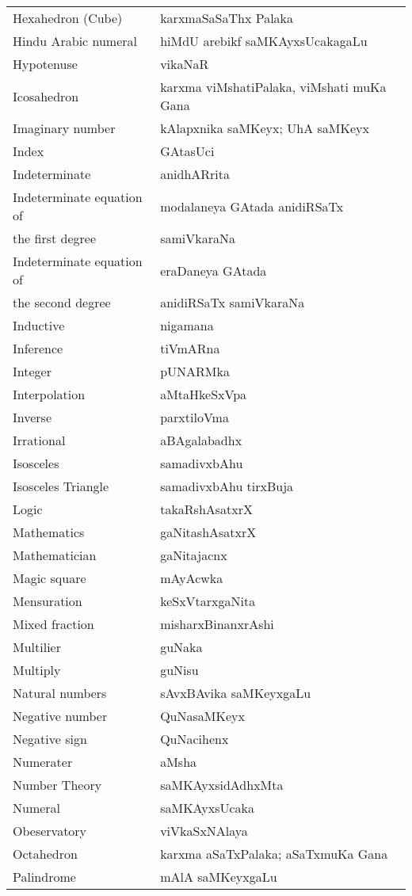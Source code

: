 {\begin{longtable}{>{\rm}l@{\hspace{1cm}}l}
Hexahedron (Cube) & karxmaSaSaThx Palaka\\
Hindu Arabic numeral & hiMdU arebikf saMKAyxsUcakagaLu\\
Hypotenuse & vikaNaR\\
Icosahedron & karxma viMshatiPalaka, viMshati muKa Gana\\
Imaginary number  & kAlapxnika saMKeyx; UhA saMKeyx\\
Index & GAtasUci\\
Indeterminate & anidhARrita\\
Indeterminate equation of & modalaneya GAtada anidiRSaTx\\[-0.1cm]
the first degree & samiVkaraNa\\
Indeterminate equation of & eraDaneya GAtada\\[-0.1cm] 
the second degree &  anidiRSaTx samiVkaraNa\\
Inductive & nigamana\\
Inference & tiVmARna\\
Integer & pUNARMka\\
Interpolation & aMtaHkeSxVpa\\
Inverse & parxtiloVma\\
Irrational & aBAgalabadhx\\
Isosceles & samadivxbAhu\\
Isosceles Triangle & samadivxbAhu tirxBuja\\
Logic & takaRshAsatxrX\\
Mathematics & gaNitashAsatxrX\\
Mathematician & gaNitajacnx\\
Magic square & mAyAcwka\\
Mensuration & keSxVtarxgaNita\\
Mixed fraction & misharxBinanxrAshi\\
Multilier & guNaka\\
Multiply & guNisu\\
Natural numbers & sAvxBAvika saMKeyxgaLu\\
Negative number & QuNasaMKeyx\\
Negative sign & QuNacihenx\\
Numerater & aMsha\\
Number Theory & saMKAyxsidAdhxMta\\
Numeral & saMKAyxsUcaka\\
Obeservatory & viVkaSxNAlaya\\
Octahedron & karxma aSaTxPalaka; aSaTxmuKa Gana\\
Palindrome & mAlA saMKeyxgaLu\\

\end{longtable}}
